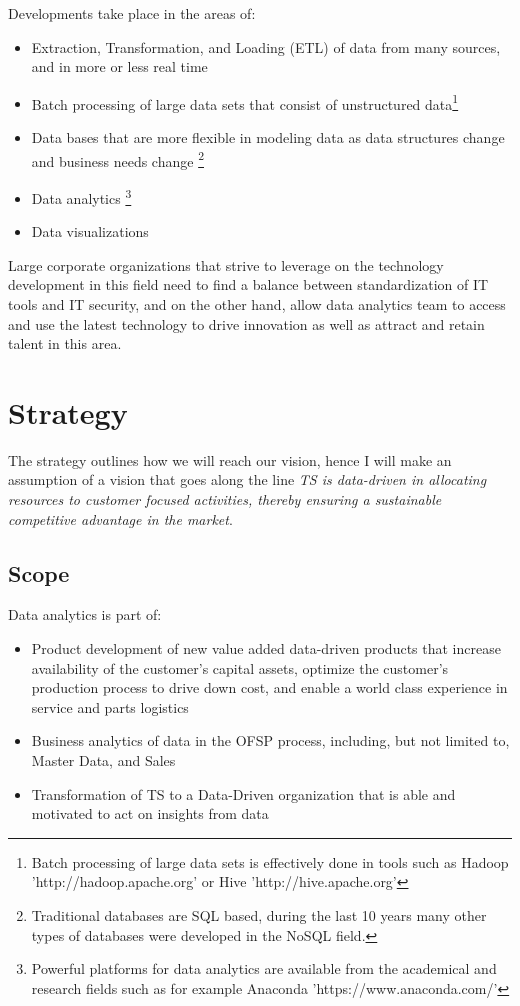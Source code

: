 \documentclass[10pt]{article} %
\begin{document}
Developments take place in the areas of:
\begin{itemize}
				\item Extraction, Transformation, and Loading (ETL) of data from many sources, and in more or less real time
				\item Batch processing of large data sets that consist of unstructured data\footnote{Batch processing of large data sets is effectively done in tools such as Hadoop 'http://hadoop.apache.org' or Hive 'http://hive.apache.org'}
				\item Data bases that are more flexible in modeling data as data structures change and business needs change \footnote{Traditional databases are SQL based, during the last 10 years many other types of databases were developed in the NoSQL field.}
				\item Data analytics \footnote{Powerful platforms for data analytics are available from the academical and research fields such as for example Anaconda 'https://www.anaconda.com/'}
				\item Data visualizations
\end{itemize}

Large corporate organizations that strive to leverage on the technology development in this field need to find a balance between standardization of IT tools and IT security, and on the other hand, allow data analytics team to access and use the latest technology to drive innovation as well as attract and retain talent in this area.

\section{Strategy}
The strategy outlines how we will reach our vision, hence I will make an assumption of a vision that goes along the line \textit{TS is data-driven in allocating resources to customer focused activities, thereby ensuring a sustainable competitive advantage in the market}.

\subsection{Scope}

Data analytics is part of:
\begin{itemize}
			\item Product development of new value added data-driven products that increase availability of the customer's capital assets, optimize the customer's production process to drive down cost, and enable a world class experience in service and parts logistics 	
			\item Business analytics of data in the OFSP process, including, but not limited to, Master Data, and Sales 
			\item  Transformation of TS to a Data-Driven organization that is able and motivated to act on insights from data 
\end{itemize}
\end{document}
